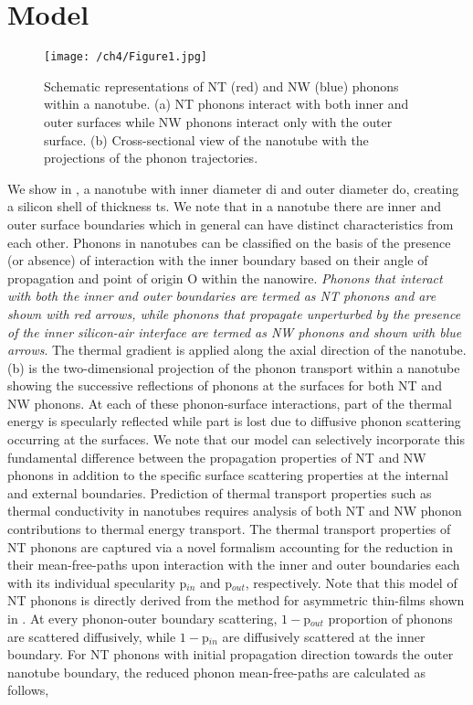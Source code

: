 \section{Model}
\begin{figure}[hb]
	\centering \texttt{[image: /ch4/Figure1.jpg]}
	\caption{Schematic representations of NT (red) and NW (blue) phonons within a nanotube. (a) NT phonons interact with both inner and outer surfaces while NW phonons interact only with the outer surface. (b) Cross-sectional view of the nanotube with the projections of the phonon trajectories.}
	\label{fig:nt_schematic}
\end{figure}

We show in , a nanotube with inner diameter \gls{di} and outer diameter \gls{do}, creating a silicon shell of thickness \gls{ts}. We note that in a nanotube there are inner and outer surface boundaries which in general can have distinct characteristics from each other. Phonons in nanotubes can be classified on the basis of the presence (or absence) of interaction with the inner boundary based on their angle of propagation and point of origin O within the nanowire. \emph{Phonons that interact with both the inner and outer boundaries are termed as NT phonons and are shown with red arrows, while phonons that propagate unperturbed by the presence of the inner silicon-air interface are termed as NW phonons and shown with blue arrows}. The thermal gradient is applied along the axial direction of the nanotube. (b) is the two-dimensional projection of the phonon transport within a nanotube showing the successive reflections of phonons at the surfaces for both NT and NW phonons. At each of these phonon-surface interactions, part of the thermal energy is specularly reflected while part is lost due to diffusive phonon scattering occurring at the surfaces. We note that our model can selectively incorporate this fundamental difference between the propagation properties of NT and NW phonons in addition to the specific surface scattering properties at the internal and external boundaries. Prediction of thermal transport properties such as thermal conductivity in nanotubes requires analysis of both NT and NW phonon contributions to thermal energy transport. The thermal transport properties of NT phonons are captured via a novel formalism accounting for the reduction in their mean-free-paths upon interaction with the inner and outer boundaries each with its individual specularity \gls{p}$_{in}$ and \gls{p}$_{out}$, respectively. Note that this model of NT phonons is directly derived from the method for asymmetric thin-films shown in . At every phonon-outer boundary scattering, $1 - $\gls{p}$_{out}$ proportion of phonons are scattered diffusively, while $1 - $\gls{p}$_{in}$ are diffusively scattered at the inner boundary. For NT phonons with initial propagation direction towards the outer nanotube boundary, the reduced phonon mean-free-paths are calculated as follows,

